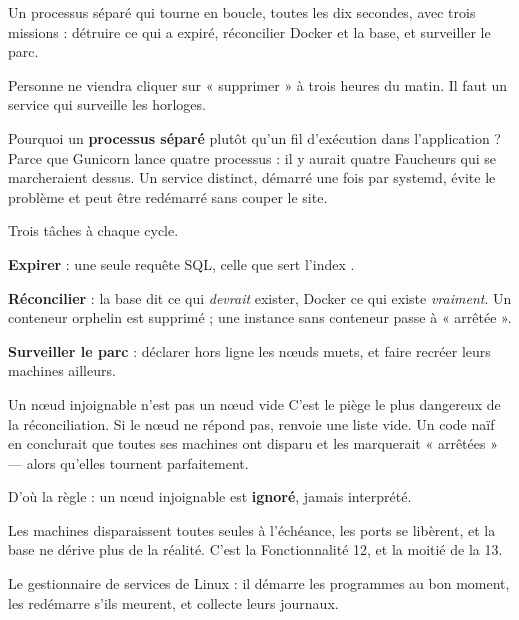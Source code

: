 
\quoi
Un processus séparé qui tourne en boucle, toutes les dix secondes, avec trois
missions : détruire ce qui a expiré, réconcilier Docker et la base, et
surveiller le parc.

\pourquoi
Personne ne viendra cliquer sur « supprimer » à trois heures du matin. Il faut
un service qui surveille les horloges.

Pourquoi un \textbf{processus séparé} plutôt qu'un fil d'exécution dans
l'application ? Parce que Gunicorn lance quatre processus : il y aurait quatre
Faucheurs qui se marcheraient dessus. Un service distinct, démarré une fois par
systemd, évite le problème et peut être redémarré sans couper le site.

\role
Trois tâches à chaque cycle.

\textbf{Expirer} : une seule requête SQL, celle que sert l'index
.

\textbf{Réconcilier} : la base dit ce qui \emph{devrait} exister, Docker ce qui
existe \emph{vraiment}. Un conteneur orphelin est supprimé ; une instance sans
conteneur passe à « arrêtée ».

\textbf{Surveiller le parc} : déclarer hors ligne les nœuds muets, et faire
recréer leurs machines ailleurs.

\begin{piege}{Un nœud injoignable n'est pas un nœud vide}
C'est le piège le plus dangereux de la réconciliation. Si le nœud ne répond pas,
 renvoie une liste vide. Un code naïf en conclurait que toutes
ses machines ont disparu et les marquerait « arrêtées » --- alors qu'elles
tournent parfaitement.

D'où la règle : un nœud injoignable est \textbf{ignoré}, jamais interprété.
\end{piege}

\apport
Les machines disparaissent toutes seules à l'échéance, les ports se libèrent, et
la base ne dérive plus de la réalité. C'est la Fonctionnalité 12, et la moitié
de la 13.


\quoi
Le gestionnaire de services de Linux : il démarre les programmes au bon moment,
les redémarre s'ils meurent, et collecte leurs journaux.

